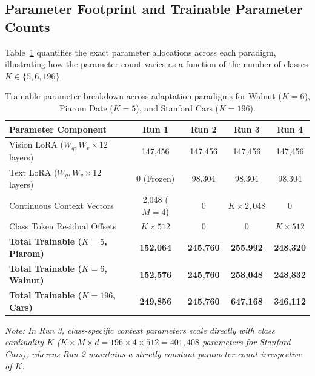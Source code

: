 \documentclass[letterpaper,11pt,leqno]{article}
\begin{document}
\subsection{Parameter Footprint and Trainable Parameter Counts}

Table~\ref{tab:parameter_counts} quantifies the exact parameter allocations across each paradigm, illustrating how the parameter count varies as a function of the number of classes $K \in \{5, 6, 196\}$.

\begin{table}[H]
\centering
\small
\caption{Trainable parameter breakdown across adaptation paradigms for Walnut ($K=6$), Piarom Date ($K=5$), and Stanford Cars ($K=196$).}
\label{tab:parameter_counts}
\begin{tabular*}{\textwidth}{@{\extracolsep{\fill}}lcccc}
\toprule
\textbf{Parameter Component} & \textbf{Run 1} & \textbf{Run 2} & \textbf{Run 3} & \textbf{Run 4} \\
\midrule
Vision LoRA ($W_q, W_v \times 12$ layers) & 147,456 & 147,456 & 147,456 & 147,456 \\
Text LoRA ($W_q, W_v \times 12$ layers)   & 0 (Frozen) & 98,304 & 98,304 & 98,304 \\
Continuous Context Vectors               & 2,048 ($M=4$) & 0 & $K \times 2,048$ & 0 \\
Class Token Residual Offsets             & $K \times 512$ & 0 & 0 & $K \times 512$ \\
\midrule
\textbf{Total Trainable ($K=5$, Piarom)}  & \textbf{152,064} & \textbf{245,760} & \textbf{255,992} & \textbf{248,320} \\
\textbf{Total Trainable ($K=6$, Walnut)}  & \textbf{152,576} & \textbf{245,760} & \textbf{258,048} & \textbf{248,832} \\
\textbf{Total Trainable ($K=196$, Cars)}  & \textbf{249,856} & \textbf{245,760} & \textbf{647,168} & \textbf{346,112} \\
\bottomrule
\end{tabular*}
\vspace{0.3em}
\raggedright\small \textit{Note: In Run 3, class-specific context parameters scale directly with class cardinality $K$ ($K \times M \times d = 196 \times 4 \times 512 = 401,408$ parameters for Stanford Cars), whereas Run 2 maintains a strictly constant parameter count irrespective of $K$.}
\end{table}

\newpage

\end{document}
